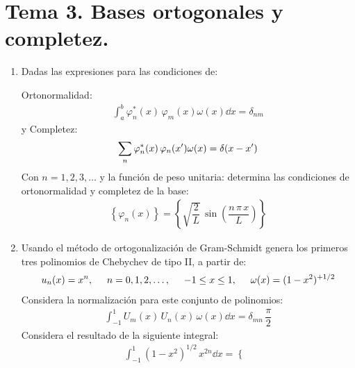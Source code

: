 \section{Tema 3. Bases ortogonales y completez.}
\begin{enumerate}
\item Dadas las expresiones para las condiciones de:
\par
Ortonormalidad:
\begin{align*}
\int_{a}^{b} \varphi_{n}^{*} (x) \, \varphi_{m} (x) \omega(x) \dd{x} = \delta_{nm}
\end{align*}
y Completez:
\begin{align*}
\sum_{n} \varphi_{n}^{*} (x) \, \varphi_{n} ({x}^{\prime})\omega(x) = \delta(x - {x}^{\prime})
\end{align*}
Con $n = 1, 2, 3, \ldots$ y la función de peso unitaria: determina las condiciones de ortonormalidad y completez de la base:
\begin{align*}
\left\{ \varphi_{n}(x) \right\} = \left\{ \sqrt{\dfrac{2}{L}} \, \sin  \left( \dfrac{n \, \pi \, x}{L} \right) \right\}
\end{align*}
\item Usando el método de ortogonalización de Gram-Schmidt genera los primeros tres polinomios de Chebychev de tipo II, a partir de:
\begin{align*}
u_{n}(x) = x^{n}, \hspace{0.5cm} n = 0, 1, 2, \ldots, \hspace{0.5cm} -1 \leq x \leq 1, \hspace{0.5cm} \omega(x) = (1 - x^{2})^{+1/2}
\end{align*}
Considera la normalización para este conjunto de polinomios:
\begin{align*}
\int_{-1}^{1} U_{m}(x) \, U_{n} (x) \, \omega(x) \dd{x} = \delta_{mn} \, \dfrac{\pi}{2}
\end{align*}
Considera el resultado de la siguiente integral:
\begin{align*}
\int_{-1}^{1} (1 - x^{2})^{1/2} \, x^{2n} \dd{x} = \begin{cases}

\end{cases}
\end{align*}
\end{enumerate}
